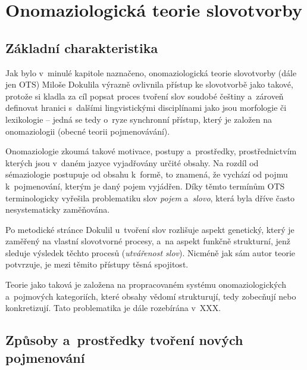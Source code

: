 \hypertarget{onomaziologickuxe1-teorie-slovotvorby}{%
\chapter{Onomaziologická teorie
slovotvorby}\label{onomaziologickuxe1-teorie-slovotvorby}}

\hypertarget{zuxe1kladnuxed-charakteristika}{%
\section{Základní
charakteristika}\label{zuxe1kladnuxed-charakteristika}}

Jak bylo v~minulé kapitole naznačeno, onomaziologická teorie slovotvorby
(dále jen OTS) Miloše Dokulila výrazně ovlivnila přístup ke slovotvorbě
jako takové, protože si kladla za cíl popsat proces tvoření slov soudobé
češtiny a~zároveň definovat hranici s~dalšími lingvistickými
disciplínami jako jsou morfologie či lexikologie -- jedná se tedy o~ryze
synchronní přístup, který je založen na onomaziologii (obecné teorii
pojmenovávání).~\parencite{enc-ots17}

Onomaziologie zkoumá takové motivace, postupy a~prostředky,
prostřednictvím kterých jsou v~daném jazyce vyjadřovány určité obsahy.
Na rozdíl od sémaziologie postupuje od obsahu k~formě, to znamená, že
vychází od pojmu k~pojmenování, kterým je daný pojem vyjádřen.
\parencite{enc-onomaz17} Díky těmto termínům OTS terminologicky vyřešila
problematiku slov \emph{pojem} a~\emph{slovo}, která byla dříve často
nesystematicky zaměňována.~\parencite[267]{rousinova07}

Po metodické stránce Dokulil u~tvoření slov rozlišuje aspekt genetický,
který je zaměřený na vlastní slovotvorné procesy, a~na aspekt funkčně
strukturní, jenž sleduje výsledek těchto procesů (\emph{utvářenost
slov}). Nicméně jak sám autor teorie potvrzuje, je mezi těmito přístupy
těsná spojitost.~\parencite[9]{dokulil62}

Teorie jako taková je založena na propracovaném systému
onomaziologických a~pojmových kategoriích, které obsahy vědomí
strukturují, tedy zobecňují nebo konkretizují. Tato problematika je dále
rozebírána v~XXX.~\parencite{enc-onomaz-kateg17}

\hypertarget{zpux16fsoby-a-prostux159edky-tvoux159enuxed-novuxfdch-pojmenovuxe1nuxed}{%
\section{Způsoby a~prostředky tvoření nových
pojmenování}\label{zpux16fsoby-a-prostux159edky-tvoux159enuxed-novuxfdch-pojmenovuxe1nuxed}}

